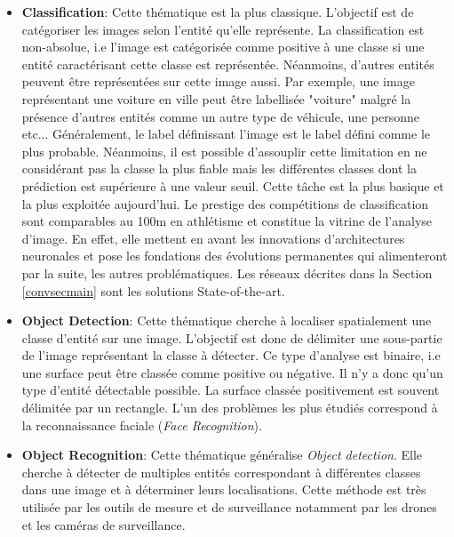 \begin{itemize}
    \item \textbf{Classification}: Cette thématique est la plus classique. L'objectif est de catégoriser les images selon l'entité qu'elle représente. La classification est non-absolue, i.e l'image est catégorisée comme positive à une classe si une entité caractérisant cette classe est représentée. Néanmoins, d'autres entités peuvent être représentées sur cette image aussi. Par exemple, une image représentant une voiture en ville peut être labellisée "voiture" malgré la présence d'autres entités comme un autre type de véhicule, une personne etc... Généralement, le label définissant l'image est le label défini comme le plus probable. Néanmoins, il est possible d'assouplir cette limitation en ne considérant pas la classe la plus fiable mais les différentes classes dont la prédiction est supérieure à une valeur seuil. Cette tâche est la plus basique et la plus exploitée aujourd'hui. Le prestige des compétitions de classification sont comparables au 100m en athlétisme et constitue la vitrine de l'analyse d'image. En effet, elle mettent en avant les innovations d'architectures neuronales et pose les fondations des évolutions permanentes qui alimenteront par la suite, les autres problématiques. Les réseaux décrites dans la Section \ref{convsecmain} sont les solutions State-of-the-art.

    \item \textbf{Object Detection}: Cette thématique cherche à localiser spatialement une classe d'entité sur une image. L'objectif est donc de délimiter une sous-partie de l'image représentant la classe à détecter. Ce type d'analyse est binaire, i.e une surface peut être classée comme positive ou négative. Il n'y a donc qu'un type d'entité détectable possible. La surface classée positivement est souvent délimitée par un rectangle. L'un des problèmes les plus étudiés correspond à la reconnaissance faciale (\textit{Face Recognition}).

    \item \textbf{Object Recognition}: Cette thématique généralise \textit{Object detection}. Elle cherche à détecter de multiples entités correspondant à différentes classes dans une image et à déterminer leurs localisations. Cette méthode est très utilisée par les outils de mesure et de surveillance notamment par les drones et les caméras de surveillance.


\end{itemize}
